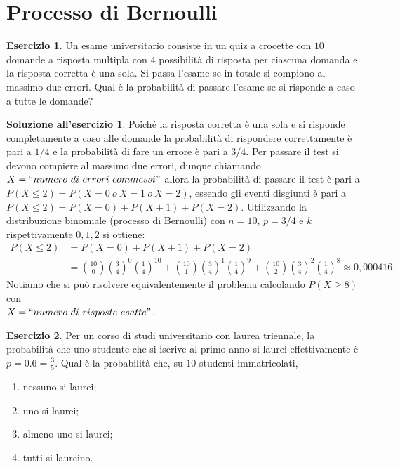 \documentclass[12pt,a4paper]{article}
\theoremstyle{definition}
\newtheorem{sol}{Soluzione all'esercizio}
\newtheorem{exe}{Esercizio}
\begin{document}
\section{Processo di Bernoulli}

\begin{exe}
	Un esame universitario consiste in un quiz a crocette con $ 10 $ domande a risposta multipla con $ 4 $ possibilità di risposta per ciascuna domanda e la risposta corretta è una sola. Si passa l'esame se in totale si compiono al massimo due errori. Qual è la probabilità di passare l'esame se si risponde a caso a tutte le domande?
\end{exe}

\begin{sol}
	Poiché la risposta corretta è una sola e si risponde completamente a caso alle domande la probabilità di rispondere correttamente è pari a $ 1/4 $ e la probabilità di fare un errore è pari a $ 3/4 $. Per passare il test si devono compiere al massimo due errori, dunque chiamando $ X = ``numero\ di\ errori\ commessi" $ allora la probabilità di passare il test è pari a $ P(X \le 2) = P(X = 0 \ o \ X = 1 \ o \ X=2) $, essendo gli eventi disgiunti è pari a $ P(X \le 2) = P(X=0) + P(X+1) + P(X=2) $. Utilizzando la distribuzione binomiale (processo di Bernoulli) con $ n=10 $, $ p=3/4 $ e $ k $ rispettivamente $ 0, 1, 2 $ si ottiene:
	\[ \begin{split}
			P(X \le 2) & = P(X=0) + P(X+1) + P(X=2)                                                                                                                                                                                           \\
			           & = \binom{10}{0}\left( \frac34\right)^{0}\left( \frac14\right)^{10}+\binom{10}{1}\left( \frac34\right)^{1}\left( \frac14\right)^{9}+\binom{10}{2}\left( \frac34\right)^{2}\left( \frac14\right)^{8} \approx 0,000416.
		\end{split} \]
	Notiamo che si può risolvere equivalentemente il problema calcolando $ P(X \ge 8) $ con \\ $ X = ``numero\ di\ risposte\ esatte" $.
\end{sol}

\begin{exe}
	Per un corso di studi universitario con laurea triennale, la probabilità che uno studente
	che si iscrive al primo anno si laurei effettivamente è $ p = 0.6 = \frac35 $. Qual è la probabilità che, su $ 10 $ studenti immatricolati,
	\begin{enumerate}
		\item  nessuno si laurei;
		\item uno si laurei;
		\item almeno uno si laurei;
		\item tutti si laureino.
	\end{enumerate}
\end{exe}
\end{document}
